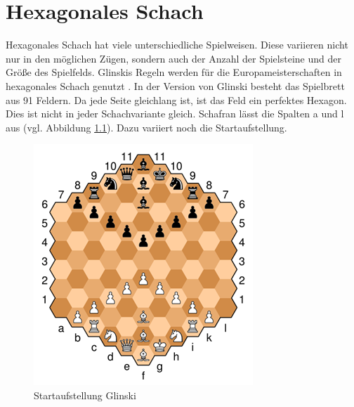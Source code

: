 \chapter{Hexagonales Schach}

Hexagonales Schach hat viele unterschiedliche Spielweisen. Diese variieren nicht nur in den möglichen Zügen, sondern auch der Anzahl der Spielsteine und der Größe des Spielfelds. Glinskis Regeln werden für die Europameisterschaften in hexagonales Schach genutzt \cite{Gados:Hexagonal}. In der Version von Glinski besteht das Spielbrett aus 91 Feldern. Da jede Seite gleichlang ist, ist das Feld ein perfektes Hexagon. Dies ist nicht in jeder Schachvariante gleich. Schafran lässt die Spalten a und l aus (vgl. Abbildung \ref{fig:hex:start}). Dazu variiert noch die Startaufstellung.

\begin{figure}[H]
    \centering
    \includegraphics{images/hexStart.png}
    \caption{Startaufstellung Glinski \protect\footnotemark}
    \label{fig:hex:start}
\end{figure}

